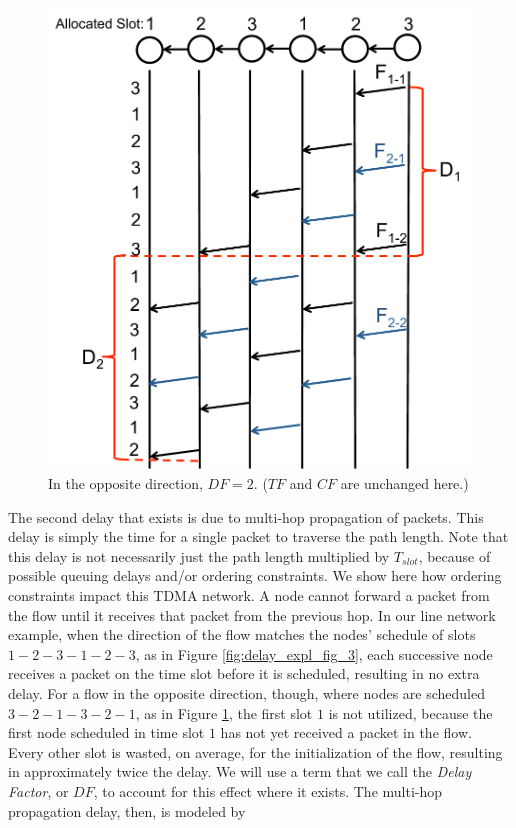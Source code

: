 \begin{figure}
\begin{centering}
    \includegraphics[scale=0.35]{figures/delay_limit_expl/fig_2_2.pdf}
    \caption{In the opposite direction, $DF = 2$. ($TF$ and $CF$ are unchanged here.)}
    \label{fig:delay_expl_fig_4}
\end{centering}
\end{figure}

The second delay that exists is due to multi-hop propagation of packets.  This delay is simply the time for a single packet to traverse the path length.  Note that this delay is not necessarily just the path length multiplied by $T_{slot}$, because of possible queuing delays and/or ordering constraints.  We show here how ordering constraints impact this TDMA network.  A node cannot forward a packet from the flow until it receives that packet from the previous hop.  In our line network example, when the direction of the flow matches the nodes' schedule of slots $1-2-3-1-2-3$, as in Figure \ref{fig:delay_expl_fig_3}, each successive node receives a packet on the time slot before it is scheduled, resulting in no extra delay.  For a flow in the opposite direction, though, where nodes are scheduled $3-2-1-3-2-1$, as in Figure \ref{fig:delay_expl_fig_4}, the first slot $1$ is not utilized, because the first node scheduled in time slot $1$ has not yet received a packet in the flow.  Every other slot is wasted, on average, for the initialization of the flow, resulting in approximately twice the delay.  We will use a term that we call the \emph{Delay Factor}, or $DF$, to account for this effect where it exists.  
The multi-hop propagation delay, then, is modeled by

